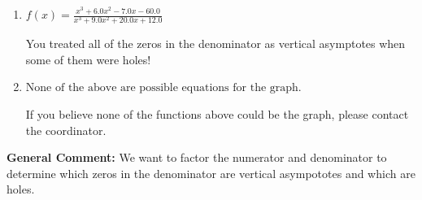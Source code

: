 \documentclass{extbook}[14pt]
\begin{document}
\begin{enumerate}
{\begin{enumerate}[label=\Alph*.]
You treated all of the zeros in the denominator as vertical asmptotes when some of them were holes and wrote factors as $x+z$.
\item \( f(x)=\frac{x^{3} +6.0 x^{2} -7.0 x -60.0}{x^{3} +9.0 x^{2} +20.0 x + 12.0} \)

You treated all of the zeros in the denominator as vertical asymptotes when some of them were holes!
\item \( \text{None of the above are possible equations for the graph.} \)

If you believe none of the functions above could be the graph, please contact the coordinator.
\end{enumerate}

\textbf{General Comment:} We want to factor the numerator and denominator to determine which zeros in the denominator are vertical asympototes and which are holes.
}
\end{enumerate}
\end{document}
